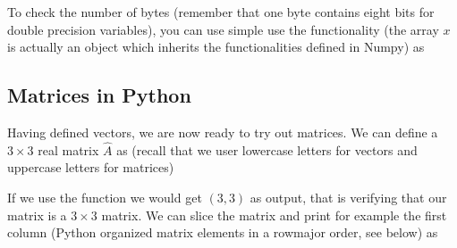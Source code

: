 \documentclass[letterpaper,10pt,english]{sphinxmanual}
\begin{document}
To check the number of bytes (remember that one byte contains eight bits for double precision variables), you can use simple use the  functionality (the array \(x\) is actually an object which inherits the functionalities defined in Numpy) as

\begin{sphinxVerbatim}[commandchars=\\\{\}]
   
  \PYG{p}{[}  \PYG{p}{]}
\end{sphinxVerbatim}


\subsection{Matrices in Python}
\label{\detokenize{chapter2:matrices-in-python}}
Having defined vectors, we are now ready to try out matrices. We can
define a \(3 \times 3 \) real matrix \(\hat{A}\) as (recall that we user
lowercase letters for vectors and uppercase letters for matrices)

\begin{sphinxVerbatim}[commandchars=\\\{\}]
   
  \PYG{p}{[} \PYG{p}{[}  \PYG{p}{]} \PYG{p}{[}  \PYG{p}{]} \PYG{p}{[}  \PYG{p}{]} \PYG{p}{]}
\end{sphinxVerbatim}

If we use the  function we would get \((3, 3)\) as output, that is verifying that our matrix is a \(3\times 3\) matrix. We can slice the matrix and print for example the first column (Python organized matrix elements in a row\sphinxhyphen{}major order, see below) as
\end{document}
